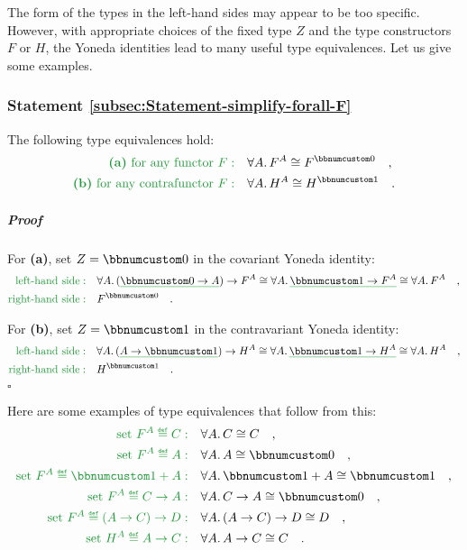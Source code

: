 The form of the types in the left-hand sides may appear to be too
specific. However, with appropriate choices of the fixed type $Z$
and the type constructors $F$ or $H$, the Yoneda identities lead
to many useful type equivalences. Let us give some examples.

\subsubsection{Statement \label{subsec:Statement-simplify-forall-F}\ref{subsec:Statement-simplify-forall-F}}

The following type equivalences hold:
\begin{align*}
{\color{greenunder}\text{\textbf{(a)} for any functor }F:}\quad & \forall A.\,F^{A}\cong F^{\bbnum 0}\quad,\\
{\color{greenunder}\text{\textbf{(b)} for any contrafunctor }F:}\quad & \forall A.\,H^{A}\cong H^{\bbnum 1}\quad.
\end{align*}


\subparagraph{Proof}

For \textbf{(a)}, set $Z=\bbnum 0$ in the covariant Yoneda identity:
\begin{align*}
{\color{greenunder}\text{left-hand side}:}\quad & \forall A.\,(\gunderline{\bbnum 0\rightarrow A})\rightarrow F^{A}\cong\forall A.\,\gunderline{\bbnum 1\rightarrow F^{A}}\cong\forall A.\,F^{A}\quad,\\
{\color{greenunder}\text{right-hand side}:}\quad & F^{\bbnum 0}\quad.
\end{align*}

For \textbf{(b)}, set $Z=\bbnum 1$ in the contravariant Yoneda identity:
\begin{align*}
{\color{greenunder}\text{left-hand side}:}\quad & \forall A.\,(\gunderline{A\rightarrow\bbnum 1})\rightarrow H^{A}\cong\forall A.\,\gunderline{\bbnum 1\rightarrow H^{A}}\cong\forall A.\,H^{A}\quad,\\
{\color{greenunder}\text{right-hand side}:}\quad & H^{\bbnum 1}\quad.
\end{align*}
 $\square$

Here are some examples of type equivalences that follow from this:
\begin{align*}
{\color{greenunder}\text{set }F^{A}\triangleq C:}\quad & \forall A.\,C\cong C\quad,\\
{\color{greenunder}\text{set }F^{A}\triangleq A:}\quad & \forall A.\,A\cong\bbnum 0\quad,\\
{\color{greenunder}\text{set }F^{A}\triangleq\bbnum 1+A:}\quad & \forall A.\,\bbnum 1+A\cong\bbnum 1\quad,\\
{\color{greenunder}\text{set }F^{A}\triangleq C\rightarrow A:}\quad & \forall A.\,C\rightarrow A\cong\bbnum 0\quad,\\
{\color{greenunder}\text{set }F^{A}\triangleq(A\rightarrow C)\rightarrow D:}\quad & \forall A.\,(A\rightarrow C)\rightarrow D\cong D\quad,\\
{\color{greenunder}\text{set }H^{A}\triangleq A\rightarrow C:}\quad & \forall A.\,A\rightarrow C\cong C\quad.
\end{align*}

